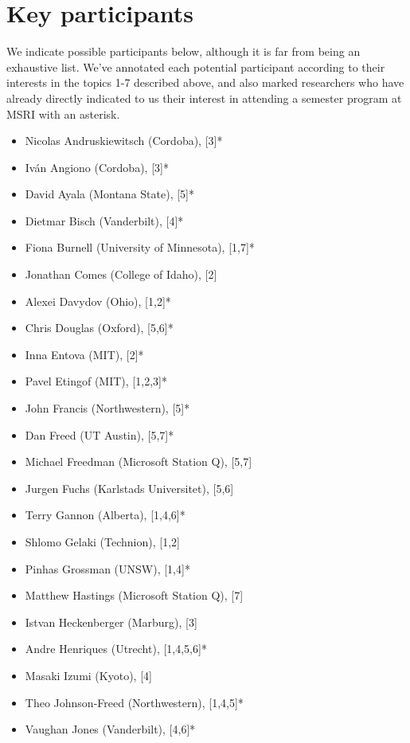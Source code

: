\documentclass[12pt]{article}
\begin{document}
\section{Key participants}
We indicate possible participants below, although it is far from being an exhaustive list. We've annotated each potential participant according to their interests in the topics 1-7 described above, and also marked researchers who have already directly indicated to us their interest in attending a semester program at MSRI with an asterisk.

\begin{multicols}{2}
\begin{itemize}
  \setlength{\itemsep}{1pt}
  \setlength{\parskip}{0pt}
  \setlength{\parsep}{0pt}
\item Nicolas Andruskiewitsch (Cordoba), [3]*
\item Iv\'an Angiono (Cordoba), [3]*
\item David Ayala (Montana State), [5]*
\item Dietmar Bisch (Vanderbilt), [4]*
\item Fiona Burnell (University of Minnesota), [1,7]*
\item Jonathan Comes (College of Idaho), [2]
\item Alexei Davydov (Ohio), [1,2]*
\item Chris Douglas (Oxford), [5,6]*
\item Inna Entova (MIT), [2]*
\item Pavel Etingof (MIT), [1,2,3]*
\item John Francis (Northwestern), [5]*
\item Dan Freed (UT Austin), [5,7]*
\item Michael Freedman (Microsoft Station Q), [5,7]
\item Jurgen Fuchs (Karlstads Universitet), [5,6]
\item Terry Gannon (Alberta), [1,4,6]*
\item Shlomo Gelaki (Technion), [1,2]
\item Pinhas Grossman (UNSW), [1,4]*
\item Matthew Hastings (Microsoft Station Q), [7]
\item Istvan Heckenberger (Marburg), [3]
\item Andre Henriques (Utrecht), [1,4,5,6]*
\item Masaki Izumi (Kyoto), [4]
\item Theo Johnson-Freed (Northwestern), [1,4,5]*
\item Vaughan Jones (Vanderbilt), [4,6]*

\end{itemize}
\end{multicols}
\end{document}
